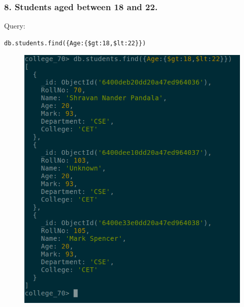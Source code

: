 \documentclass{article}
\begin{document}
\subsubsection*{8. Students aged between 18 and 22.}
Query:
\begin{Verbatim}[frame=single,framerule=1pt,fontfamily=courier,fontsize=\small]
db.students.find({Age:{$gt:18,$lt:22}})
\end{Verbatim}
\begin{figure}[H]
    \centering
    \includegraphics[width=\textwidth]{cycle7/7.8.png}
\end{figure}
\end{document}
